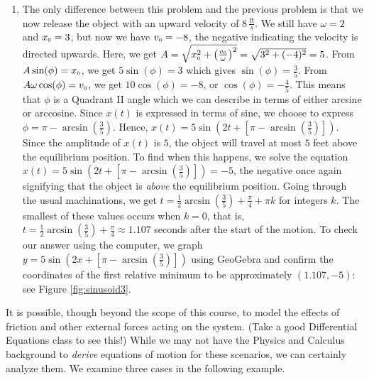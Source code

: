 {\begin{enumerate}

\item  The only difference between this problem and the previous problem is that we now release the object with an upward velocity of $8 \, \frac{\text{ft}}{s}$.  We still have $\omega = 2$ and $x_{\text{\tiny $0$}} = 3$, but now we have $v_{\text{\tiny $0$}} = -8$, the negative indicating the velocity is directed upwards. Here, we get $A = \sqrt{x_{\text{\tiny $0$}}^2 + \left( \frac{v_{\text{\tiny $0$}}}{\omega}\right)^2} = \sqrt{3^2 + (-4)^2} = 5$.  From $A\sin(\phi) = x_{\text{\tiny $0$}}$, we get $5\sin(\phi) = 3$ which gives $\sin(\phi) = \frac{3}{5}$.  From  $A\omega\cos(\phi) = v_{\text{\tiny $0$}}$, we get $10\cos(\phi) = -8$, or $\cos(\phi) = -\frac{4}{5}$.  This means that $\phi$ is a Quadrant II angle which we can describe in terms of either arcsine or arccosine.  Since $x(t)$ is expressed in terms of sine, we choose to express $\phi = \pi - \arcsin\left(\frac{3}{5}\right)$.  Hence, $x(t)= 5 \sin\left(2t + \left[\pi - \arcsin\left(\frac{3}{5}\right)\right]\right)$.  Since the amplitude of $x(t)$ is $5$, the object will travel at most $5$ feet above the equilibrium position.  To find when this happens, we solve the equation $x(t)= 5 \sin\left(2t + \left[\pi - \arcsin\left(\frac{3}{5}\right)\right]\right)= -5$, the negative once again signifying that the object is \textit{above} the equilibrium position.  Going through the usual machinations, we get $t = \frac{1}{2} \arcsin\left(\frac{3}{5}\right) +\frac{\pi}{4}  + \pi k$ for integers $k$. The smallest of these values occurs when $k=0$, that is, $t = \frac{1}{2} \arcsin\left(\frac{3}{5}\right) +\frac{\pi}{4} \approx 1.107$ seconds after the start of the motion. To check our answer using the computer, we graph $y = 5 \sin\left(2x + \left[\pi - \arcsin\left(\frac{3}{5}\right)\right]\right)$ using GeoGebra and confirm the coordinates of the first relative minimum to be approximately $(1.107,-5)$: see Figure \ref{fig:sinusoid3}.


\end{enumerate}
}

\medskip

It is possible, though beyond the scope of this course, to model the effects of friction and other external forces acting on the system. (Take a good Differential Equations class to see this!)  While we may not have the Physics and Calculus background to \textit{derive} equations of motion for these scenarios, we can certainly analyze them.  We examine three cases in the following example.

